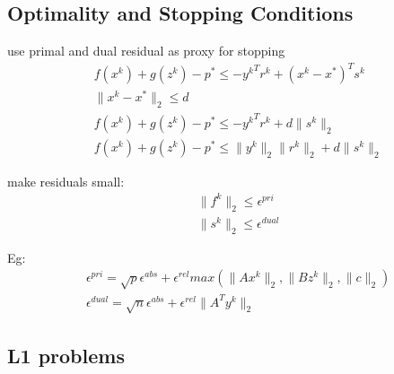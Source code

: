 \documentclass[8pt]{report}
\newcommand{\norm}[1]{\|#1\|}
\begin{document}
\begin{multicols*}{2}
\subsection{Optimality and Stopping Conditions}
  use primal and dual residual as proxy for stopping\\
  \begin{align*}
    &f(x^k)+g(z^k)-p^* \leq -{y^k}^T r^k + (x^k-x^*)^T s^k\\
    &\norm{x^k-x^*}_2 \leq d\\
    &f(x^k)+g(z^k)-p^* \leq -{y^k}^T r^k + d \norm{s^k}_2\\
    &f(x^k)+g(z^k)-p^* \leq \norm{y^k}_2 \norm{r^k}_2 + d \norm{s^k}_2
  \end{align*}

  make residuals small:
  \begin{align*}
    &\norm{f^k}_2 \leq \epsilon^{pri}\\
    &\norm{s^k}_2 \leq \epsilon^{dual}
  \end{align*}

  Eg:
  \begin{align*}
    &\epsilon^{pri}=\sqrt{p} \epsilon^{abs} + \epsilon^{rel} max(\norm{Ax^k}_2, \norm{Bz^k}_2, \norm{c}_2)\\
    &\epsilon^{dual}=\sqrt{n} \epsilon^{abs} + \epsilon^{rel} \norm{A^T y^k}_2
  \end{align*}
    
  \vfill\null
  \columnbreak

  \subsection{L1 problems}
  

\end{multicols*}
\end{document}
